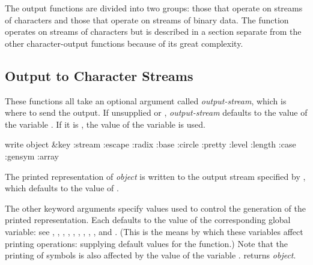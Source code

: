 The output functions are divided into two groups: those that
operate on streams of characters and those that operate on
streams of binary data.  The function  operates
on streams of characters but is described in a section
separate from the other character-output functions
because of its great complexity.

\subsection {Output to Character Streams}

These functions all take an optional argument called \emph{output-stream},
which is where to send the output.  If unsupplied or {\false}, \emph{output-stream}
defaults to the value of the variable
.  If it is {\true}, the value of the variable
 is used.

\begin{obsolete}
\begin{defun}[Function]
write object &key :stream :escape :radix :base :circle :pretty :level :length :case :gensym :array

The printed representation of \emph{object} is written to the output stream
specified by , which defaults to the value of .

The other keyword arguments specify values used to control the
generation of the printed representation.  Each defaults to the
value of the corresponding global variable: see ,
, , , ,
, ,
,
,
and .
(This is the means by which these variables affect printing operations:
supplying default values for the  function.)
Note that the printing of symbols is also affected by the value
of the variable .
 returns \emph{object}.
\end{defun}
\end{obsolete}

